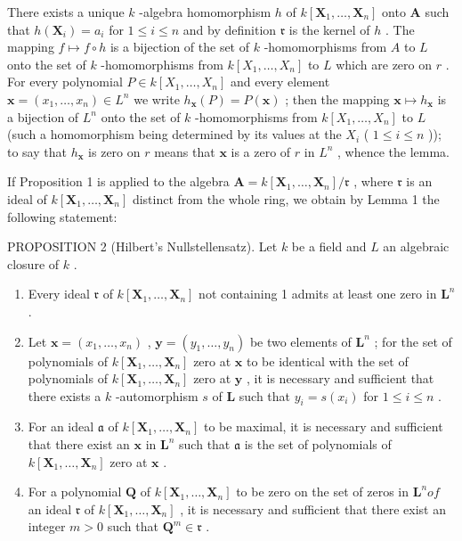 There exists a unique \(k\) -algebra homomorphism \(h\) of \(k[\mathbf{X}_1, \ldots, \mathbf{X}_n]\) onto \(\mathbf{A}\) such that \(h(\mathbf{X}_i) = a_i\) for \(1 \leqslant i \leqslant n\) and by definition \(\mathfrak{r}\) is the kernel of \(h\) . The mapping \(f \mapsto f \circ h\) is a bijection of the set of \(k\) -homomorphisms from \(A\) to \(L\) onto the set of \(k\) -homomorphisms from \(k[X_1, \ldots, X_n]\) to \(L\) which are zero on \(r\) . For every polynomial \(P \in k[X_1, \ldots, X_n]\) and every element \(\mathbf{x} = (x_1, \ldots, x_n) \in L^n\) we write \(h_{\mathbf{x}}(P) = P(\mathbf{x})\) ; then the mapping \(\mathbf{x} \mapsto h_{\mathbf{x}}\) is a bijection of \(L^n\) onto the set of \(k\) -homomorphisms from \(k[X_1, \ldots, X_n]\) to \(L\) (such a homomorphism being determined by its values at the \(X_i\) ( \(1 \leqslant i \leqslant n\) )); to say that \(h_{\mathbf{x}}\) is zero on \(r\) means that \(\mathbf{x}\) is a zero of \(r\) in \(L^n\) , whence the lemma.

If Proposition 1 is applied to the algebra \(\mathbf{A} = k[\mathbf{X}_1, \ldots, \mathbf{X}_n] / \mathfrak{r}\) , where \(\mathfrak{r}\) is an ideal of \(k[\mathbf{X}_1, \ldots, \mathbf{X}_n]\) distinct from the whole ring, we obtain by Lemma 1 the following statement:

PROPOSITION 2 (Hilbert's Nullstellensatz). Let \(k\) be a field and \(L\) an algebraic closure of \(k\) .

\begin{enumerate}
\def\labelenumi{(\roman{enumi})}
\item
  Every ideal \(\mathfrak{r}\) of \(k[\mathbf{X}_1, \ldots, \mathbf{X}_n]\) not containing 1 admits at least one zero in \(\mathbf{L}^n\) .
\item
  Let \(\mathbf{x} = (x_1, \ldots, x_n)\) , \(\mathbf{y} = (y_1, \ldots, y_n)\) be two elements of \(\mathbf{L}^n\) ; for the set of polynomials of \(k[\mathbf{X}_1, \ldots, \mathbf{X}_n]\) zero at \(\mathbf{x}\) to be identical with the set of polynomials of \(k[\mathbf{X}_1, \ldots, \mathbf{X}_n]\) zero at \(\mathbf{y}\) , it is necessary and sufficient that there exists a \(k\) -automorphism \(s\) of \(\mathbf{L}\) such that \(y_i = s(x_i)\) for \(1 \leqslant i \leqslant n\) .
\item
  For an ideal \(\mathfrak{a}\) of \(k[\mathbf{X}_1, \ldots, \mathbf{X}_n]\) to be maximal, it is necessary and sufficient that there exist an \(\mathbf{x}\) in \(\mathbf{L}^n\) such that \(\mathfrak{a}\) is the set of polynomials of \(k[\mathbf{X}_1, \ldots, \mathbf{X}_n]\) zero at \(\mathbf{x}\) .
\item
  For a polynomial \(\mathbf{Q}\) of \(k[\mathbf{X}_1, \ldots, \mathbf{X}_n]\) to be zero on the set of zeros in \(\mathbf{L}^n of\) an ideal \(\mathfrak{r}\) of \(k[\mathbf{X}_1, \ldots, \mathbf{X}_n]\) , it is necessary and sufficient that there exist an integer \(m > 0\) such that \(\mathbf{Q}^m \in \mathfrak{r}\) .
\end{enumerate}


